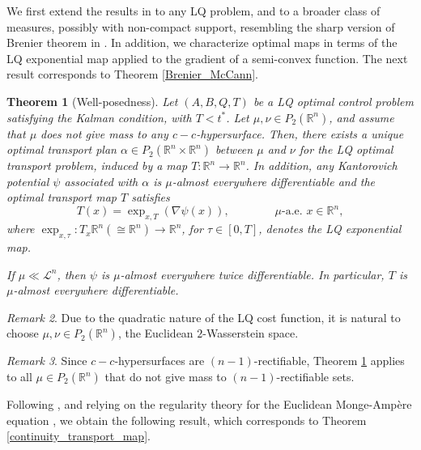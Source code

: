 \documentclass[reqno]{amsart}
\theoremstyle{plain}
\newtheorem{thm}{Theorem}[section]
\theoremstyle{definition}
\theoremstyle{remark}
\newtheorem{rem}[thm]{Remark}
\newcommand{\R}{\mathbb{R}}
\begin{document}
We first extend the results in \cite{hinpomriff2011} to any LQ problem, and to a broader class of measures, possibly with non-compact support, resembling the sharp version of Brenier theorem in \cite{GigliInverseBrenier2009}. In addition, we characterize optimal maps in terms of the LQ exponential map applied to the gradient of a semi-convex function. The next result corresponds to Theorem \ref{Brenier_McCann}.
	
	\begin{thm}[Well-posedness]\label{Brenier_McCann_intro}  Let $(A,B,Q,T)$ be a LQ optimal control problem satisfying the Kalman condition, with $T<t^*$. Let $\mu,\nu\in P_2(\mathbb{R}^n)$, and assume that $\mu$ does not give mass to any $c-c$-hypersurface. Then, there exists a unique optimal transport plan $\alpha\in P_2(\mathbb{R}^n\times\mathbb{R}^n)$ between $\mu$ and $\nu$ for the LQ optimal transport problem, induced by a map $T:\mathbb{R}^n\to\mathbb{R}^n$.
        In addition, any Kantorovich potential $\psi$ associated with $\alpha$ is $\mu$-almost everywhere differentiable and the optimal transport map $T$ satisfies
        \begin{equation}
            T(x)=\exp_{x,T}(\nabla\psi(x)),\qquad\qquad \mu\text{-a.e. }x\in\mathbb{R}^n,
        \end{equation}
        where $\exp_{x,\tau}:T_x\mathbb{R}^n(\cong\mathbb{R}^n)\to\mathbb{R}^n$, for $\tau\in[0,T]$, denotes the LQ exponential map.

        If $\mu\ll\mathscr{L}^n$, then $\psi$ is $\mu$-almost everywhere twice differentiable. In particular, $T$ is $\mu$-almost everywhere differentiable.
	\end{thm}
    
    \begin{rem}
 Due to the quadratic nature of the LQ cost function, it is natural to choose $\mu,\nu \in P_2(\R^n)$, the Euclidean $2$-Wasserstein space.
    \end{rem}
\begin{rem}    
	Since $c-c$-hypersurfaces are $(n-1)$-rectifiable, Theorem \ref{Brenier_McCann_intro} applies to all $\mu\in P_2(\mathbb{R}^n)$ that do not give mass to $(n-1)$-rectifiable sets. 
    \end{rem}
	
    Following \cite{hinpomriff2011}, and relying on the regularity theory for the Euclidean Monge-Ampère equation \cite{CaffarelliRegConvMaps}, we obtain the following result, which corresponds to Theorem \ref{continuity_transport_map}.
    
\end{document}
